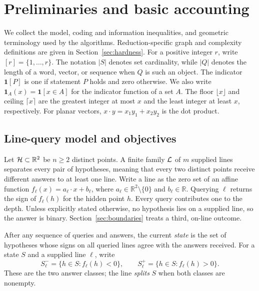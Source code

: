\section{Preliminaries and basic accounting}
\label{sec:preliminaries}

We collect the model, coding and information inequalities, and
geometric terminology used by the algorithms. Reduction-specific
graph and complexity definitions are given in
Section~\ref{sec:hardness}.
For a positive integer $r$, write $[r]=\{1,\ldots,r\}$.
The notation $|S|$ denotes set cardinality, while $|Q|$ denotes
the length of a word, vector, or sequence when $Q$ is such an object.
The indicator $\mathbf1[P]$ is one if statement $P$ holds and zero
otherwise. We also write $\mathbf1_A(x)=\mathbf1[x\in A]$ for
the indicator function of a set $A$.
The floor $\lfloor x\rfloor$ and ceiling $\lceil x\rceil$
are the greatest integer at most $x$ and the least integer at least
$x$, respectively. For planar vectors,
$x\cdot y=x_1y_1+x_2y_2$ is the dot product.

\subsection{Line-query model and objectives}

Let $\mathcal H\subset\mathbb R^2$ be $n\ge2$ distinct points. A finite family
$\mathcal L$ of $m$ supplied lines separates every pair of hypotheses,
meaning that every two distinct points receive different answers to
at least one line. Write a line as the zero set of an affine function
$f_\ell(x)=a_\ell\cdot x+b_\ell$, where
$a_\ell\in\mathbb R^2\setminus\{0\}$ and $b_\ell\in\mathbb R$.
Querying $\ell$ returns the sign of $f_\ell(h)$ for
the hidden point $h$. Every query contributes one to the depth.
Unless explicitly stated otherwise, no hypothesis lies on a supplied
line, so the answer is binary.
Section~\ref{sec:boundaries} treats a third, on-line outcome.

After any sequence of queries and answers, the current \emph{state}
is the set of hypotheses whose signs on all queried lines agree with
the answers received. For a state $S$ and a supplied line $\ell$,
write
\[
 S_\ell^-=\{h\in S:f_\ell(h)<0\},\qquad
 S_\ell^+=\{h\in S:f_\ell(h)>0\}.
\]
These are the two answer classes; the line \emph{splits} $S$ when
both classes are nonempty.

